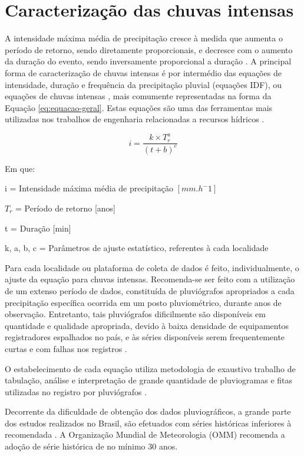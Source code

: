 \section{Caracterização das chuvas intensas}

A intensidade máxima média de precipitação cresce à medida que aumenta o período de retorno, sendo diretamente proporcionais, e decresce com o aumento da duração do evento, sendo inversamente proporcional a duração \cite{analise-chuva}. A principal forma de caracterização de chuvas intensas é por intermédio das equações de intensidade, duração e frequência da precipitação pluvial (equações IDF), ou equações de chuvas intensas \cite{tucci1993}, mais comumente representadas na forma da Equação \ref{eq:equacao-geral}. Estas equações são uma das ferramentas mais utilizadas nos trabalhos de engenharia relacionadas a recursos hídricos \cite{desagregacao}.

\begin{equation}
\label{eq:equacao-geral}
    i = \frac{k \times T_r^a}{(t+b)^c}
\end{equation}

Em que:

i = Intensidade máxima média de precipitação  $[mm.h^-1]$ 

$T_r$ = Período de retorno [anos]

t = Duração [min]

k, a, b, c = Parâmetros de ajuste estatístico, referentes à cada localidade \\

\par Para cada localidade ou plataforma de coleta de dados é feito, individualmente, o ajuste da equação para chuvas intensas. Recomenda-se ser feito com a utilização de um extenso período de dados, constituída de pluviógrafos \cite{interpolacao-chuva} apropriados a cada precipitação específica ocorrida em um posto pluviométrico, durante anos de observação. Entretanto, tais pluviógrafos dificilmente são disponíveis em quantidade e qualidade apropriada, devido à baixa densidade de equipamentos registradores espalhados no país, e às séries disponíveis serem frequentemente curtas e com falhas nos registros \cite{relacao-precipitacao}.

O estabelecimento de cada equação utiliza metodologia de exaustivo trabalho de tabulação, análise e interpretação de grande quantidade de pluviogramas e fitas utilizadas no registro por pluviógrafos \cite{relacao-precipitacao}. 

Decorrente da dificuldade de obtenção dos dados pluviográficos, a grande parte dos estudos realizados no Brasil, são efetuados com séries históricas inferiores à recomendada \cite{variabilidade-espacial}. A Organização Mundial de Meteorologia (OMM) recomenda a adoção de série histórica de no mínimo 30 anos.

